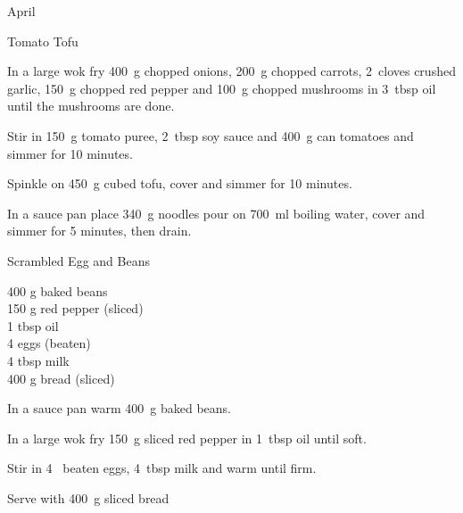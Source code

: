 \begin{menu}{April}
\begin{recipe}{2}{Tomato Tofu}
	
    \begin{instructions}
    \item 
        In a large wok fry
        400~g chopped onions,
        200~g chopped carrots,
        2~cloves crushed garlic,
        150~g chopped red pepper
        and
        100~g chopped mushrooms
        in
        3~tbsp  oil
        until the mushrooms are done.
      \item 
        Stir in
        150~g  tomato puree,
        2~tbsp  soy sauce
        and
        400~g  can tomatoes
        and simmer for 10 minutes.
      \item 
        Spinkle on
        450~g cubed tofu,
        cover and simmer for 10 minutes.
      \item 
    In a
    sauce pan
    place
    340~g  noodles
    pour on
    700~ml  boiling water,
    cover and simmer for 5 minutes, then drain.
  
    \end{instructions}
    \end{recipe}%
  
    \begin{recipe}{1}{Scrambled Egg and Beans}%
		\begin{ingredients}
		400 g baked beans  \\
	150 g red pepper (sliced) \\
	1 tbsp oil  \\
	4  eggs (beaten) \\
	4 tbsp milk  \\
	400 g bread (sliced) \\
	
		\end{ingredients}
	
	
    \begin{instructions}
    \item 
        In a sauce pan warm
        400~g  baked beans.
      \item 
        In a large wok fry
        150~g sliced red pepper
        in
        1~tbsp  oil
        until soft.
      \item 
        Stir in
        4~ beaten eggs,
        4~tbsp  milk
        and warm until firm.
      \item 
        Serve with
        400~g sliced bread
    \end{instructions}
    \end{recipe}%
  
    \clearpage
    \end{menu}
	
